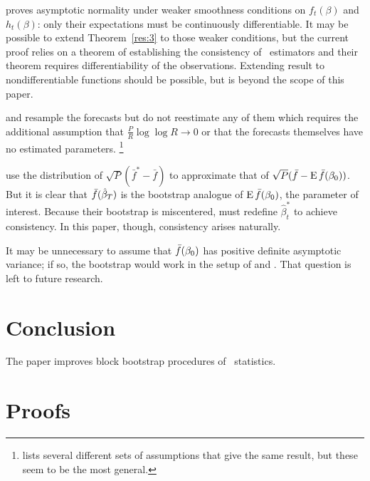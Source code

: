 \documentclass[12pt,fleqn]{article}
\begin{document}
\begin{rem}
  \citet{Mcc:00} proves asymptotic normality under weaker smoothness
  conditions on $f_t(\beta)$ and $h_t(\beta)$: only their expectations
  must be continuously differentiable.  It may be possible to extend
  Theorem~\ref{res:3} to those weaker conditions, but the current
  proof relies on a theorem of  establishing the
  consistency of \hac\ estimators and their theorem requires differentiability of
  the observations.  Extending  result to
  nondifferentiable functions should be possible, but is beyond the
  scope of this paper.
\end{rem}

\begin{rem}
  \citet{Whi:00} and \citet{Han:05} resample the forecasts but do not
  reestimate any of them which requires the additional assumption that
  $\tfrac{P}{R} \log \log R \to 0$ or that the forecasts themselves
  have no estimated parameters.%
\footnote{\citet{Whi:00} lists several
    different sets of assumptions that give the same result, but these
    seem to be the most general.} %
\end{rem}

\begin{rem}
  \citet{CoS:07} use the distribution of $\sqrt{P}(\bar{f}^{*} -
  \bar{f})$ to approximate that of $\sqrt{P}(\bar{f} - \E
  \bar{f}(\btrue))$.  But it is clear that $\bar{f}(\btrue[*])$
  is the bootstrap analogue of $\E \bar{f}(\btrue)$, the parameter of
  interest.  Because their bootstrap is miscentered, \citet{CoS:07}
  must redefine $\hat{\beta}_t^{*}$ to achieve consistency.  In this
  paper, though, consistency arises naturally.
\end{rem}

\begin{rem}
  It may be unnecessary to assume that $\bar{f}(\btrue)$ has positive
  definite asymptotic variance; if so, the bootstrap would work in the
  setup of \citet{ClM:05,ClM:01} and \citet{Mcc:07}.  That question is
  left to future research.
\end{rem}

\section{Conclusion}\label{sec:4}
The paper improves block bootstrap procedures of \oos\
statistics.

\appendix
\section{Proofs}\label{sec:B}
\end{document}
